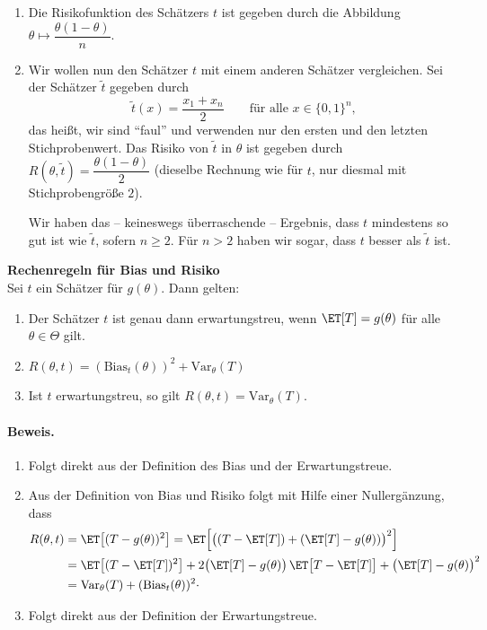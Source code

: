 \begin{bsp}
\begin{enumerate}[label=(\alph*)]
        \item Die \gls{Risikofunktion} des \gls{Schätzer}s $t$ ist gegeben durch die Abbildung $\theta\mapsto\dfrac{\theta(1-\theta)}{n}$.
        \item Wir wollen nun den \gls{Schätzer} $t$ mit einem anderen \gls{Schätzer} vergleichen.
        Sei der \gls{Schätzer} $\tilde t$ gegeben durch
        \[
            \tilde t(x) = \frac{x_1+x_n}{2} \qquad \text{für alle } x\in\{0,1\}^n ,
        \]
        das heißt, wir sind ``faul'' und verwenden nur den ersten und den letzten Stichprobenwert.
        Das Risiko von $\tilde t$ in $\theta$ ist gegeben durch $R(\theta,\tilde t) = \dfrac{\theta(1-\theta)}{2}$ (dieselbe Rechnung wie für $t$, nur diesmal mit Stichprobengröße $2$).

        Wir haben das -- keineswegs überraschende -- Ergebnis, dass $t$ mindestens so gut ist wie $\tilde t$, sofern $n\geq2$.
        Für $n>2$ haben wir sogar, dass $t$ besser als $\tilde t$ ist.
    \end{enumerate}
\end{bsp}

\begin{lem}\textbf{Rechenregeln für Bias und Risiko}  \\
    Sei $t$ ein \gls{Schätzer} für $g(\theta)$.
    Dann gelten:
    \begin{enumerate}[label=(\alph*)]
        \item Der \gls{Schätzer} $t$ ist genau dann erwartungstreu, wenn $\ET[T]=g(\theta)$ für alle $\theta\in\Theta$ gilt.
        \item $R(\theta,t) = (\mathrm{Bias}_t(\theta))^2 + \mathrm{Var}_\theta(T)$
        \item Ist $t$ erwartungstreu, so gilt $R(\theta,t) = \mathrm{Var}_\theta(T)$.
    \end{enumerate}
    \paragraph{Beweis.}
\begin{enumerate}[label=(\alph*)]
    \item Folgt direkt aus der Definition des Bias und der Erwartungstreue.
    \item Aus der Definition von Bias und Risiko folgt mit Hilfe einer Nullergänzung, dass
    \begin{align*}
        R(\theta,t) &= \ET\big[(T-g(\theta))^2\big] = \ET\Big[\big((T-\ET[T])+(\ET[T]-g(\theta))\big)^2\Big] \\
        &= \ET\big[(T-\ET[T])^2\big] + 2\big(\ET[T]-g(\theta)\big)\,\ET\big[T-\ET[T]\big] + \big(\ET[T]-g(\theta)\big)^2 \\
        &= \mathrm{Var}_\theta(T) + (\mathrm{Bias}_t(\theta))^2 \cdot
    \end{align*}
    \item Folgt direkt aus der Definition der Erwartungstreue. \qedhere
\end{enumerate}
\end{lem}

